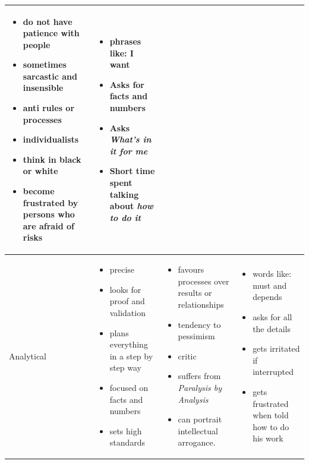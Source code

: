 \begin{table}[h]
\begin{tabular}{p{}p{}p{}p{}}
      \begin{itemize}
       \item do not have patience with people
       \item sometimes sarcastic and insensible
       \item anti rules or processes
       \item individualists
       \item think in black or white
       \item become frustrated by persons who are afraid of risks
      \end{itemize}
     & 
     \begin{itemize}
      \item phrases like: I want
      \item Asks for facts and numbers
      \item Asks \textit {What's in it for me}
      \item Short time spent talking about \textit {how to do it}
     \end{itemize}
     \\ \midrule
    Analytical
     &
      \begin{itemize}
       \item precise
       \item looks for proof and validation
       \item plans everything in a step by step way
       \item focused on facts and numbers
       \item sets high standards
      \end{itemize}
     &
      \begin{itemize}
       \item favours processes over results or relationships
       \item tendency to pessimism
       \item critic
       \item suffers from \textit{Paralysis by Analysis}
       \item can portrait intellectual arrogance.
      \end{itemize}
     &
      \begin{itemize}
       \item words like: must and depends
       \item asks for all the details
       \item gets irritated if interrupted
       \item gets frustrated when told how to do his work

\end{itemize}
\end{tabular}
\end{table}
